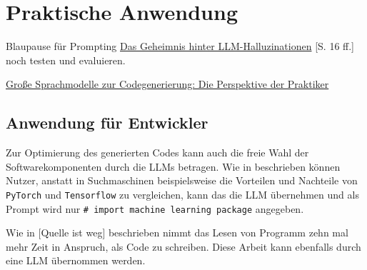 
\section{Praktische Anwendung}
Blaupause für Prompting \href{https://piamedia.com/wp-content/uploads/2024/09/PIAM_Whitepaper_LLM-Halluzinationen_DE.pdf}{Das Geheimnis hinter LLM-Halluzinationen} [S. 16 ff.] noch testen und evaluieren.

\href{https://arxiv.org/html/2501.16998v1}{Große Sprachmodelle zur Codegenerierung: Die Perspektive der Praktiker}

\subsection{Anwendung für Entwickler}
Zur Optimierung des generierten Codes kann auch die freie Wahl der Softwarekomponenten durch die LLMs betragen. Wie in \cite{chen-2021} beschrieben können Nutzer, anstatt in Suchmaschinen beispielsweise die Vorteilen und Nachteile von \texttt{PyTorch} und \texttt{Tensorflow} zu vergleichen, kann das die LLM übernehmen und als Prompt wird nur \texttt{\# import machine learning package} angegeben.\vspace{0.2cm}

Wie in [Quelle ist weg] beschrieben nimmt das Lesen von Programm zehn mal mehr Zeit in Anspruch, als Code zu schreiben. Diese Arbeit kann ebenfalls durch eine LLM übernommen werden.